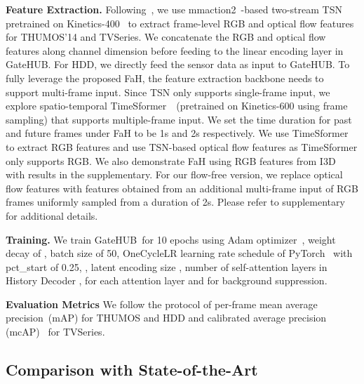 \documentclass[10pt,twocolumn,letterpaper]{article}
\newcommand{\methodname}{GateHUB}
\begin{document}
{\bf Feature Extraction.}
Following~\cite{xu2021long, wang2021oadtr}, we use mmaction2~\cite{2020mmaction2}-based two-stream TSN~\cite{wang2016temporal} pretrained on Kinetics-400~\cite{carreira2017quo} to extract frame-level RGB and optical flow features for THUMOS'14 and TVSeries. 
We concatenate the RGB and optical flow features along channel dimension before feeding to the linear encoding layer in \methodname. For HDD, we directly feed the sensor data as input to \methodname.
To fully leverage the proposed FaH, the feature extraction backbone needs to support multi-frame input. Since TSN only supports single-frame input, we explore spatio-temporal TimeSformer~\cite{bertasius2021space}~(pretrained on Kinetics-600 using  frame sampling) that supports multiple-frame input. 
We set the time duration for past  and future  frames under FaH to be 1s and 2s respectively. 
We use TimeSformer to extract RGB features and use TSN-based optical flow features as TimeSformer only supports RGB. We also demonstrate FaH using RGB features from I3D~\cite{carreira2017quo} with results in the supplementary. For our flow-free version, we replace optical flow features with features obtained from an additional multi-frame input of RGB frames uniformly sampled from a duration of 2s. Please refer to supplementary for additional details.




{\bf Training.}
We train \methodname~for 10 epochs using Adam optimizer~\cite{kingma2014adam}, weight decay of ,  batch size of 50, OneCycleLR learning rate schedule of PyTorch~\cite{paszke2017automatic} with pct\_start of 0.25, , latent encoding size , number of self-attention layers in History Decoder ,  for each attention layer and  for background suppression.





{\bf Evaluation Metrics}
We follow the protocol of per-frame mean average precision~(mAP) for THUMOS and HDD and calibrated average precision (mcAP)~\cite{de2016online} for TVSeries.

\subsection{Comparison with State-of-the-Art}
\end{document}
